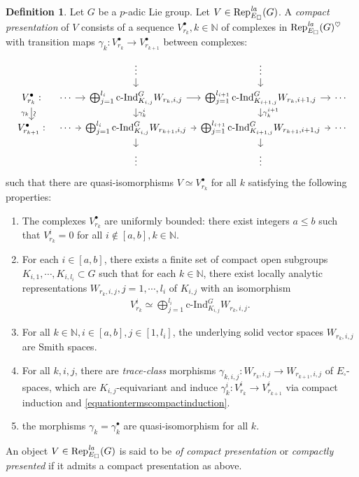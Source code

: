\documentclass[a4paper,10pt]{amsart}
\theoremstyle{remark}
\theoremstyle{definition}
\newtheorem{definition}[theorem]{Definition}
\theoremstyle{plain}
\numberwithin{equation}{section}
\newcommand{\bbN}{{\mathbb N}}
\newcommand{\la}{{\it la}}
\newcommand{\Rep}{{\rm Rep}}
\newcommand{\cInd}{\mathrm{c\text{-}Ind}}
\begin{document}
\begin{definition}\label{deffinitepresentation}
	Let $G$ be a $p$-adic Lie group. Let $V\in \Rep^{\la}_{E_\square}(G)$. A \emph{compact presentation} of $V$ consists of a sequence $V_{r_k}^{\bullet},k\in \bbN$ of complexes in $\Rep^{\la}_{E_\square}(G)^{\heartsuit}$ with transition maps $\gamma_{k}:V_{r_k}^{\bullet}\to V_{r_{k+1}}^{\bullet}$ between complexes:
	\[
	\begin{tikzcd}[column sep=tiny,row sep=small] && \vdots \arrow[d] & \vdots \arrow[d] & \\
	V_{r_k}^{\bullet}:\arrow[d,"\text{\rotatebox[origin=c]{90}{$\sim$}}","\gamma_k"']&\cdots \arrow[r] & \bigoplus_{j=1}^{l_i}\cInd_{K_{i,j}}^G W_{r_k,i,j} \arrow[r]\arrow[d,"\gamma_k^i"] & \bigoplus_{j=1}^{l_{i+1}}\cInd_{K_{i+1,j}}^G W_{r_k,i+1,j} \arrow[r]\arrow[d,"\gamma_k^{i+1}"] & \cdots \\
	V_{r_{k+1}}^{\bullet}:&\cdots \arrow[r] & \bigoplus_{j=1}^{l_i}\cInd_{K_{i,j}}^G W_{r_{k+1},i,j} \arrow[r]\arrow[d] & \bigoplus_{j=1}^{l_{i+1}}\cInd_{K_{i+1,j}}^G W_{r_{k+1},i+1,j} \arrow[r]\arrow[d] & \cdots \\
	&& \vdots & \vdots &
\end{tikzcd}
\]
such that there are quasi-isomorphisms $V\simeq V_{r_k}^{\bullet}$ for all $k$ satisfying the following properties:
	\begin{enumerate}
		\item The complexes $V_{r_k}^{\bullet}$ are uniformly bounded: there exist integers $ a\leq b$ such that $V_{r_k}^i=0$ for all $i\notin [a,b],k\in\bbN$.
		\item For each $i\in [a,b]$, there exists a finite set of compact open subgroups $K_{i,1},\cdots, K_{i, l_i}\subset G$ such that for each $k\in \bbN$, there exist locally analytic representations $W_{r_k,i,j},j=1,\cdots,l_i$ of $K_{i,j}$ with an isomorphism
		\begin{align}\label{equationtermscompactinduction}
			V_{r_k}^i\simeq \bigoplus_{j=1}^{l_i} \cInd_{K_{i,j}}^G W_{r_k,i,j}.
		\end{align}
		\item For all $k\in\bbN,i\in [a,b],j\in [1,l_i]$, the underlying solid vector spaces $W_{r_k,i,j}$ are Smith spaces.
		\item For all $k,i,j$, there are \emph{trace-class} morphisms $\gamma_{k,i,j}:W_{r_k,i,j}\rightarrow W_{r_{k+1},i,j}$ of $E_{\square}$-spaces, which are $K_{i,j}$-equivariant and induce $\gamma_{k}^i:V_{r_k}^i\rightarrow V_{r_{k+1}}^i$ via compact induction and \eqref{equationtermscompactinduction}.
		\item the morphisms $\gamma_{k}=\gamma_k^{\bullet}$ are quasi-isomorphism for all $k$.
	\end{enumerate}
	An object $V\in \Rep^{\la}_{E_\square}(G)$ is said to be \emph{of compact presentation} or \emph{compactly presented} if it admits a compact presentation as above.
\end{definition}
\end{document}

